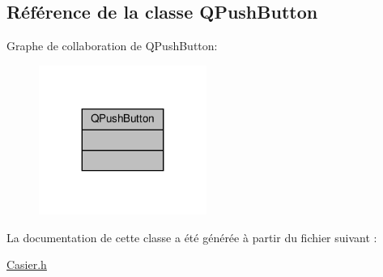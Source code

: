 \hypertarget{class_q_push_button}{}\subsection{Référence de la classe Q\+Push\+Button}
\label{class_q_push_button}


Graphe de collaboration de Q\+Push\+Button\+:
\nopagebreak
\begin{figure}[H]
\begin{center}
\leavevmode
\includegraphics[width=155pt]{class_q_push_button__coll__graph}
\end{center}
\end{figure}


La documentation de cette classe a été générée à partir du fichier suivant \+:\begin{DoxyCompactItemize}
\item 
\hyperlink{_casier_8h}{Casier.\+h}\end{DoxyCompactItemize}

